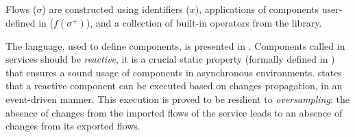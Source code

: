 Flows ($\sigma$) are constructed using identifiers ($x$), applications of components
user-defined in \GRSync ($f(\sigma^+)$), and a collection of built-in operators from the \GReact
library.

The \GRSync language, used to define components, is presented in .
%
Components called in services should be \emph{reactive}, it is a crucial static property (formally defined
in ) that
ensures a sound usage of components in asynchronous environments.
 states that a reactive component can be executed
based on changes propagation, in an event-driven manner. This execution is proved to be resilient to
\emph{oversampling}: the absence of changes from the imported flows of the service leads to an
absence of changes from its exported flows.

